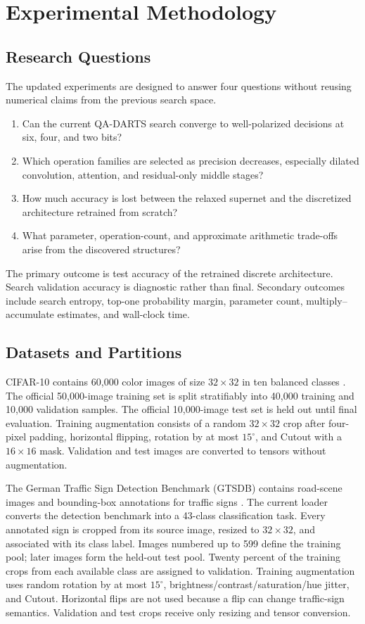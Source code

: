 \documentclass[lettersize,journal]{IEEEtran}
\begin{document}
\section{Experimental Methodology}
\subsection{Research Questions}
The updated experiments are designed to answer four questions without reusing numerical claims from the previous search space.

\begin{enumerate}
\item Can the current QA-DARTS search converge to well-polarized decisions at six, four, and two bits?
\item Which operation families are selected as precision decreases, especially dilated convolution, attention, and residual-only middle stages?
\item How much accuracy is lost between the relaxed supernet and the discretized architecture retrained from scratch?
\item What parameter, operation-count, and approximate arithmetic trade-offs arise from the discovered structures?
\end{enumerate}

The primary outcome is test accuracy of the retrained discrete architecture. Search validation accuracy is diagnostic rather than final. Secondary outcomes include search entropy, top-one probability margin, parameter count, multiply--accumulate estimates, and wall-clock time.

\subsection{Datasets and Partitions}
CIFAR-10 contains 60,000 color images of size $32\times32$ in ten balanced classes \cite{krizhevsky2009cifar}. The official 50,000-image training set is split stratifiably into 40,000 training and 10,000 validation samples. The official 10,000-image test set is held out until final evaluation. Training augmentation consists of a random $32\times32$ crop after four-pixel padding, horizontal flipping, rotation by at most $15^{\circ}$, and Cutout with a $16\times16$ mask. Validation and test images are converted to tensors without augmentation.

The German Traffic Sign Detection Benchmark (GTSDB) contains road-scene images and bounding-box annotations for traffic signs \cite{houben2013gtsdb}. The current loader converts the detection benchmark into a 43-class classification task. Every annotated sign is cropped from its source image, resized to $32\times32$, and associated with its class label. Images numbered up to 599 define the training pool; later images form the held-out test pool. Twenty percent of the training crops from each available class are assigned to validation. Training augmentation uses random rotation by at most $15^{\circ}$, brightness/contrast/saturation/hue jitter, and Cutout. Horizontal flips are not used because a flip can change traffic-sign semantics. Validation and test crops receive only resizing and tensor conversion.
\end{document}
